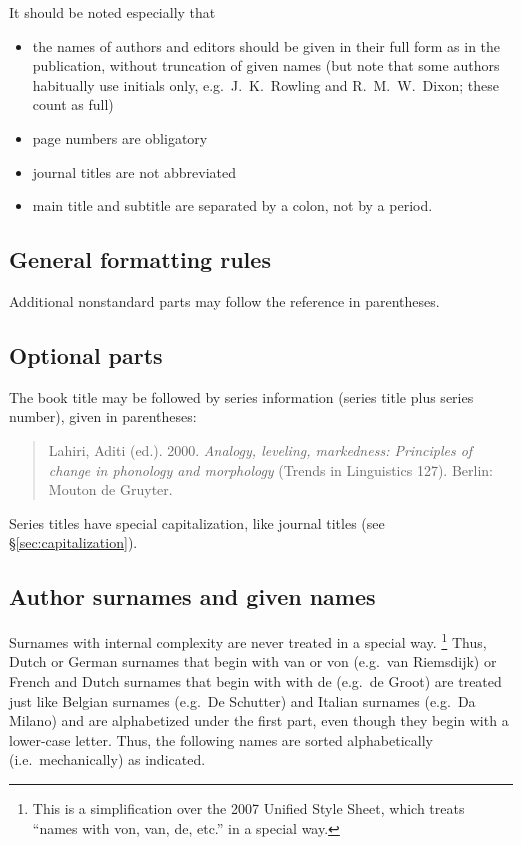 \documentclass[a4paper]{article}
\newcommand{\sectref}[1]{§\ref{#1}}
\newenvironment{gsrexq}{\begin{quote}\color{blue}}{\end{quote}}
\newcommand{\gsrex}[1]{{\color{blue}#1}}
\begin{document}
It should be noted especially that

\begin{itemize}
\item  the names of authors and editors should be given in their full form as in the publication, without truncation of given names (but note that some authors habitually use initials only, e.g.~\gsrex{J.~K.~Rowling} and \gsrex{R.~M.~W.~Dixon}; these count as full)
\item page numbers are obligatory
\item journal titles are not abbreviated
\item main title and subtitle are separated by a colon, not by a period.
\end{itemize}

\subsection{General formatting rules}\label{sec:general-formatting-rules}

Additional nonstandard parts may follow the reference in parentheses.

\subsection{Optional parts}\label{sec:optional-parts}

The book title may be followed by series information (series title plus
series number), given in parentheses: 
\begin{gsrexq}
Lahiri, Aditi (ed.). 2000. \textit{Analogy, leveling, markedness: Principles of change in phonology and morphology} (Trends in Linguistics 127). Berlin: Mouton de Gruyter.
\end{gsrexq}

Series titles have special capitalization, like journal titles (see \sectref{sec:capitalization}). 

\subsection{Author surnames and given names}\label{sec:author-surnames-and-given-names}

Surnames with internal complexity are never treated in a special way.
\footnote{This 
  is a simplification over the 2007 Unified Style Sheet, which treats ``names with von, van, de, etc.'' in a special way.
}
Thus, Dutch or German surnames that begin with van or von (e.g.~van
Riemsdijk) or French and Dutch surnames that begin with with de (e.g.~de
Groot) are treated just like Belgian surnames (e.g.~De Schutter) and
Italian surnames (e.g.~Da Milano) and are alphabetized under the first
part, even though they begin with a lower-case letter. Thus, the
following names are sorted alphabetically (i.e.~mechanically) as
indicated. 
\end{document}
